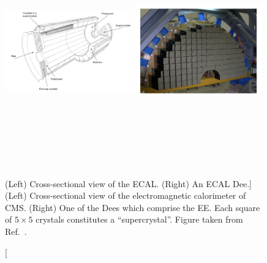 \begin{figure}[!htb]
    \centering
    \captionsetup{justification=justified}
    \includegraphics[width=0.49\textwidth,height=10cm,keepaspectratio]{figures/cms/ecal/xs_whiteblack.jpeg}
    \includegraphics[width=0.49\textwidth,height=10cm,keepaspectratio]{figures/cms/ecal/dee.jpeg}
    \caption
        [(Left) Cross-sectional view of the ECAL. (Right) An ECAL Dee.]
        {
        (Left) Cross-sectional view of the electromagnetic calorimeter of CMS.
        (Right) One of the Dees which comprise the EE.
        Each square of $5 \times 5$ crystals constitutes a ``supercrystal''.
        Figure taken from Ref.~\cite{collaboration_cms_2008}.
        }
    \label{fig:ecal_xs}
\end{figure}

